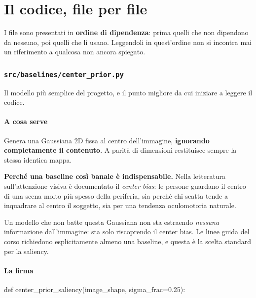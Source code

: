 \newpage

\part{Il codice, file per file}

I file sono presentati in \textbf{ordine di dipendenza}: prima quelli che non dipendono da
nessuno, poi quelli che li usano. Leggendoli in quest'ordine non si incontra mai un riferimento
a qualcosa non ancora spiegato.

\section{\texttt{src/baselines/center\_prior.py}}

Il modello più semplice del progetto, e il punto migliore da cui iniziare a leggere il codice.

\subsection{A cosa serve}

Genera una Gaussiana 2D fissa al centro dell'immagine, \textbf{ignorando completamente il
contenuto}. A parità di dimensioni restituisce sempre la stessa identica mappa.

\begin{nota}
\textbf{Perché una baseline così banale è indispensabile.} Nella letteratura sull'attenzione
visiva è documentato il \emph{center bias}: le persone guardano il centro di una scena molto più
spesso della periferia, sia perché chi scatta tende a inquadrare al centro il soggetto, sia per
una tendenza oculomotoria naturale.

\medskip
Un modello che non batte questa Gaussiana non sta estraendo \emph{nessuna} informazione
dall'immagine: sta solo riscoprendo il center bias. Le linee guida del corso richiedono
esplicitamente almeno una baseline, e questa è la scelta standard per la saliency.
\end{nota}

\subsection{La firma}

\begin{idebox}
\begin{pycode}
def center_prior_saliency(image_shape, sigma_frac=0.25):
\end{pycode}
\end{idebox}

